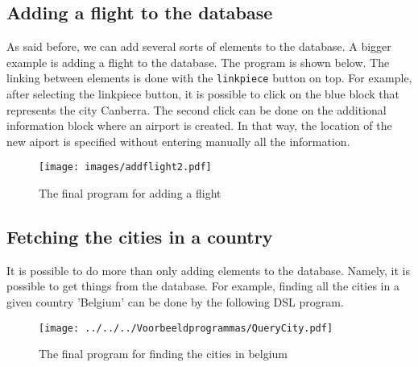 \subsection{Adding a flight to the database}
As said before, we can add several sorts of elements to the database. A bigger example is adding a flight to the database. The program is shown below. The linking between elements is done with the \texttt{linkpiece} button on top. For example, after selecting the linkpiece button, it is possible to click on the blue block that represents the city Canberra. The second click can be done on the additional information block where an airport is created. In that way, the location of the new aiport is specified without entering manually all the information.
\begin{figure}[H]
	\centering
	\texttt{[image: images/addflight2.pdf]}
	\caption{The final program for adding a flight}
	\label{ex:addFlight}
\end{figure}

\subsection{Fetching the cities in a country}
It is possible to do more than only adding elements to the database. Namely, it is possible to get things from the database. For example, finding all the cities in a given country 'Belgium' can be done by the following DSL program.
\begin{figure}[H]
	\centering
	\texttt{[image: ../../../Voorbeeldprogrammas/QueryCity.pdf]}
	\caption{The final program for finding the cities in belgium}
	\label{ex:getCities}
\end{figure}